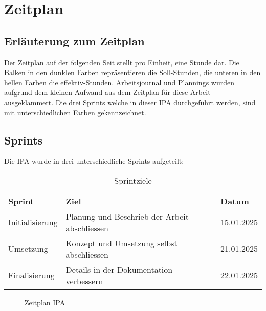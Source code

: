 \chapter{Zeitplan}

\section{Erläuterung zum Zeitplan}
Der Zeitplan auf der folgenden Seit stellt pro Einheit, eine Stunde dar. Die Balken in den
dunklen Farben repräsentieren die Soll-Stunden, die unteren in den hellen Farben die effektiv-Stunden.
Arbeitsjournal und Plannings wurden aufgrund dem kleinen Aufwand aus dem Zeitplan für diese Arbeit ausgeklammert.
Die drei Sprints welche in dieser IPA durchgeführt werden, sind mit unterschiedlichen Farben gekennzeichnet.

\section{Sprints}
Die IPA wurde in drei unterschiedliche Sprints aufgeteilt: 

\begin{table}[h!]
  \begin{tabular}{|L{0.3\textwidth}|L{0.4\textwidth}|L{0.3\textwidth}|}
      \hline
       \color{white}\textbf{Sprint} & \color{white}\textbf{Ziel} & \color{white}\textbf{Datum} \\[12pt]
      \hline
      Initialisierung & Planung und Beschrieb der Arbeit abschliessen & 15.01.2025 \\
     \hline
     Umsetzung & Konzept und Umsetzung selbst abschliessen & 21.01.2025 \\
     \hline
     Finalisierung & Details in der Dokumentation verbessern & 22.01.2025 \\
     \hline
    \end{tabular}
    \caption{Sprintziele}
\end{table}

\newpage
\storeareas\zeitplan
{}
\areaset
  {\dimexpr\the\paperwidth-1cm\relax}%
  {\dimexpr\the\paperheight-5.5cm\relax}%
\recalctypearea

 \begin{figure}[htp] 
     \caption{Zeitplan IPA}
 \end{figure}

\restoregeometry
\zeitplan
\newpage

